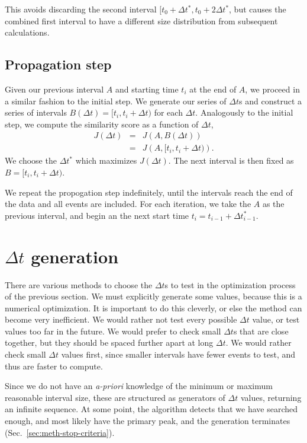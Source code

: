 \documentclass[draft]{article}
\begin{document}
This avoids discarding the second interval $[t_0+\Delta t^*,
t_0+2\Delta t^*$, but causes the combined first interval to have a
different size distribution from subsequent calculations.

\subsection{Propagation step}
\label{sec:meth-propagation}
Given our previous interval $A$ and starting time $t_i$ at the end of
$A$, we proceed in a similar fashion to the initial step.  We generate our series
of $\Delta t$s and construct a series of intervals $B(\Delta t) = [t_i,
t_i+\Delta t)$ for each $\Delta t$.  Analogously to the initial step, we
compute the similarity score as a function of $\Delta t$,
\begin{eqnarray}
  J(\Delta t) &=& J\left(A, B(\Delta t)\right) \nonumber \\
              &=& J\left(A,  [t_i, t_i+\Delta t)\right).
              \label{eq:J-max2}
\end{eqnarray}
We choose the $\Delta t^*$ which maximizes $J(\Delta t)$.  The next
interval is then fixed as $B = [t_i, t_i+\Delta t)$.

We repeat the propogation step indefinitely, until the intervals reach
the end of the data and all events are included.  For each iteration,
we take the $A$ as the previous interval, and begin an the next start
time $t_i = t_{i-1} + \Delta t^*_{i-1}$.



\section{$\Delta t$ generation}
\label{sec:meth-dt}
There are various methods to choose the $\Delta t$s to test in the
optimization process of the previous section.  We must explicitly
generate some values, because this is a numerical optimization.  It is important to do
this cleverly, or else the method can become very inefficient.  We
would rather not test every possible $\Delta t$ value, or test values
too far in the future.  We would prefer to check small $\Delta t$s
that are close together, but they should be spaced further apart at
long $\Delta t$.  We would rather check small $\Delta t$ values first,
since smaller intervals have fewer events to test, and thus are faster
to compute.

Since we do not have an \textit{a-priori} knowledge of the minimum or
maximum reasonable interval size, these are structured as generators
of $\Delta t$ values, returning an infinite sequence.  At some point,
the algorithm detects that we have searched enough, and most likely
have the primary peak, and the generation terminates
(Sec.~\ref{sec:meth-stop-criteria}).
\end{document}
